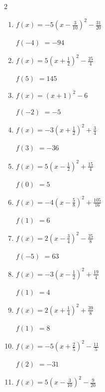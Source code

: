 \begin{multicols}{2}
\begin{enumerate}
$f(-1)$
        $=3$

\columnbreak %

\resetques

  \item $\displaystyle f(x)=-5\left( x-\frac{3}{10}\right)^{2}-\frac{31}{20}$

$f(-4)$
        $=-94$

  \item $\displaystyle f(x)=5\left( x+\frac{1}{2}\right)^{2}-\frac{25}{4}$

$f(5)$
        $=145$

  \item $\displaystyle f(x)=\left( x+1\right)^{2}-6$

$f(-2)$
        $=-5$

  \item $\displaystyle f(x)=-3\left( x+\frac{1}{2}\right)^{2}+\frac{3}{4}$

$f(3)$
        $=-36$

  \item $\displaystyle f(x)=5\left( x-\frac{1}{2}\right)^{2}+\frac{15}{4}$

$f(0)$
        $=5$

\columnbreak %

  \item $\displaystyle f(x)=-4\left( x-\frac{5}{8}\right)^{2}+\frac{105}{16}$

$f(1)$
        $=6$

  \item $\displaystyle f(x)=2\left( x-\frac{3}{4}\right)^{2}-\frac{25}{8}$

$f(-5)$
        $=63$

  \item $\displaystyle f(x)=-3\left( x-\frac{1}{2}\right)^{2}+\frac{19}{4}$

$f(1)$
        $=4$

  \item $\displaystyle f(x)=2\left( x+\frac{1}{4}\right)^{2}+\frac{39}{8}$

$f(1)$
        $=8$

  \item $\displaystyle f(x)=-5\left( x+\frac{2}{5}\right)^{2}-\frac{11}{5}$

$f(2)$
        $=-31$

\columnbreak %

\resetques

  \item $\displaystyle f(x)=5\left( x-\frac{3}{10}\right)^{2}-\frac{9}{20}$


\end{enumerate}
\end{multicols}
